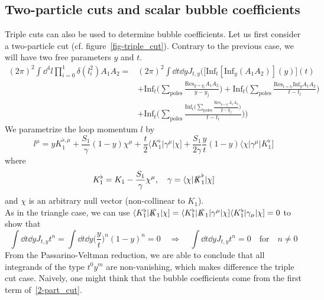 \subsection*{Two-particle cuts and scalar bubble coefficients}
Triple cuts can also be used to determine bubble coefficients. 
Let us first consider a two-particle cut (cf. figure~\ref{fig-triple_cut}).
Contrary to the previous case, we will have two free parameters $y$ and $t$.
\begin{equation}\label{2-part_cut}
\begin{split}
(2\pi)^2\int \dd^4 l \prod_{i=0}^1 \delta(l_i^2) A_1 A_2 = & 
(2\pi)^2\int \dd t\dd y J_{t,y}\Big(\big[\mathrm{Inf}_t [\mathrm{Inf}_y(A_1A_2)](y)\big](t) 
\\&
+
\mathrm{Inf}_t\big(\sum_{\textrm{poles}}\frac{\mathrm{Res}_{y = y_i}A_1A_2}{y-y_j})
+
\mathrm{Inf}_t\big(\sum_{\textrm{poles}}\frac{\mathrm{Res}_{t = t_l}\mathrm{Inf}_y A_1A_2}{t-t_l})
\\ &
+
\mathrm{Inf}_t\big(\sum_{\textrm{poles}}\frac{\mathrm{Inf}_t\big(\sum_{\textrm{poles}}\frac{\mathrm{Res}_{y = y_i}A_1A_2}{y-y_j}\big)}{t-t_l}\big)
\Big)
\end{split}
\end{equation}
We parametrize the loop momentum $l$ by
\begin{equation}
l^\mu = yK_1^{\flat,\mu} + \frac{S_1}{\gamma}(1-y)\chi^\mu + \frac{t}{2}\langle K_1^\flat|\gamma^\mu|\chi] + \frac{S_1}{2\gamma}\frac{y}{t}(1-y)\langle \chi|\gamma^\mu|K_1^\flat]
\end{equation}
where
\begin{equation}
K_1^\flat = K_1 - \frac{S_1}{\gamma}\chi^\mu ,\quad
\gamma = \langle \chi | \slashed{K}_1^\flat|\chi]
\end{equation}
and $\chi$ is an arbitrary null vector (non-collinear to $K_1$).
\\
As in the triangle case, we can use $\langle K_1^\flat| \slashed{K}_1|\chi] = \langle K_1^\flat|\slashed{K}_1 | \gamma^\mu|\chi]\langle K_1^\flat|\gamma_\mu|\chi]= 0$ to show that
\begin{equation}
\int\dd t\dd y J_{t,y}t^n = \int \dd t \dd y \big(\frac{y}{t}\big)^n(1-y)^n = 0
\quad\Rightarrow\quad
\int \dd t \dd y J_{t,y}t^n = 0
\quad\textrm{for}\quad n\neq 0
\end{equation} 
From the Passarino-Veltman reduction, we are able to conclude that all integrands of the type $t^0y^m$ are non-vanishing, which makes difference \wrt the triple cut case. 
Naively, one might think that the bubble coefficients come from the first term of~\cref{2-part_cut}.
